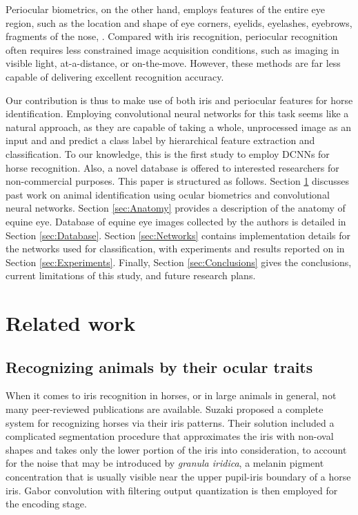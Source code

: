 \documentclass[10pt,twocolumn,letterpaper]{article}
\begin{document}
Periocular biometrics, on the other hand, employs features of the entire eye region, such as the location and shape of eye corners, eyelids, eyelashes, eyebrows, fragments of the nose, \etc. Compared with iris recognition, periocular recognition often requires less constrained image acquisition conditions, such as imaging in visible light, at-a-distance, or on-the-move. However, these methods are far less capable of delivering excellent recognition accuracy. 

Our contribution is thus to make use of both iris and periocular features for horse identification. Employing convolutional neural networks for this task seems like a natural approach, as they are capable of taking a whole, unprocessed image as an input and and predict a class label by hierarchical feature extraction and classification. To our knowledge, this is the first study to employ DCNNs for horse recognition. Also, a novel database is offered to interested researchers for non-commercial purposes. This paper is structured as follows. Section \ref{sec:Related} discusses past work on animal identification using ocular biometrics and convolutional neural networks. Section \ref{sec:Anatomy} provides a description of the anatomy of equine eye. Database of equine eye images collected by the authors is detailed in Section \ref{sec:Database}. Section \ref{sec:Networks} contains implementation details for the networks used for classification, with experiments and results reported on in Section \ref{sec:Experiments}. Finally, Section \ref{sec:Conclusions} gives the conclusions, current limitations of this study, and future research plans.

\section{Related work}
\label{sec:Related}

\subsection{Recognizing animals by their ocular traits}
When it comes to iris recognition in horses, or in large animals in general, not many peer-reviewed publications are available. Suzaki \etal \cite{SuzakiHorseIris2001} proposed a complete system for recognizing horses via their iris patterns. Their solution included a complicated segmentation procedure that approximates the iris with non-oval shapes and takes only the lower portion of the iris into consideration, to account for the noise that may be introduced by \emph{granula iridica}, a melanin pigment concentration that is usually visible near the upper pupil-iris boundary of a horse iris. Gabor convolution with filtering output quantization is then employed for the encoding stage. 
\end{document}
